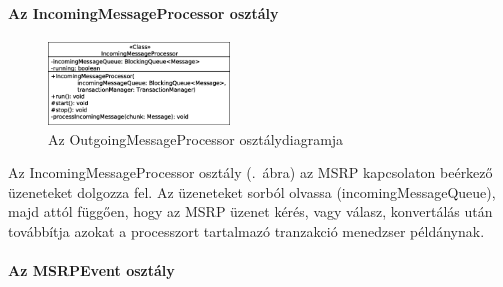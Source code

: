 \paragraph{Az IncomingMessageProcessor osztály\\}
\label{sec:msrp_incomingprocessor}
\begin{figure}
  \vspace{-15pt}
  \begin{center}
    \includegraphics[width=0.43\textwidth]{img/class_diagrams/IncomingMessageProcessor.eps}
  \end{center}
  \vspace{-15pt}
  \captionsetup{font=scriptsize}
  \caption{Az OutgoingMessageProcessor osztálydiagramja}
   \label{fig:class_incomingprocessor}
  \vspace{-10pt}
\end{figure}
Az IncomingMessageProcessor osztály (.~ábra) az MSRP kapcsolaton beérkező üzeneteket dolgozza fel. Az üzeneteket sorból olvassa (incomingMessageQueue), majd attól függően, hogy az MSRP üzenet kérés, vagy válasz, konvertálás után továbbítja azokat a processzort tartalmazó tranzakció menedzser példánynak. 

\paragraph{Az MSRPEvent osztály\\}
\label{sec:msrp_event}

